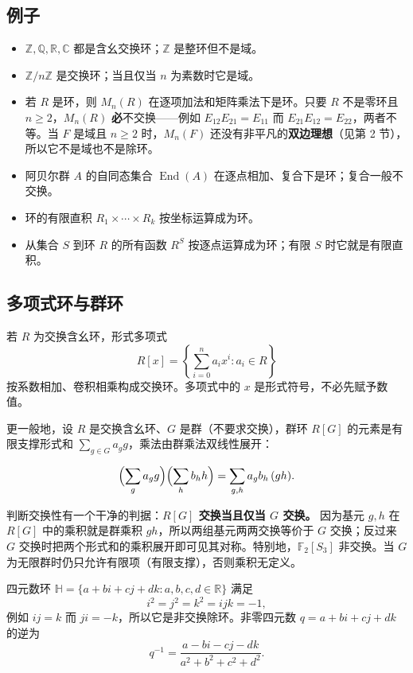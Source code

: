 \subsection{例子}


\begin{itemize}
\item $\mathbb Z,\mathbb Q,\mathbb R,\mathbb C$ 都是含幺交换环；$\mathbb Z$ 是整环但不是域。
\item $\mathbb Z/n\mathbb Z$ 是交换环；当且仅当 $n$ 为素数时它是域。
\item 若 $R$ 是环，则 $M_n(R)$ 在逐项加法和矩阵乘法下是环。只要 $R$ 不是零环且 $n\ge2$，$M_n(R)$ \textbf{必}不交换——例如 $E_{12}E_{21}=E_{11}$ 而 $E_{21}E_{12}=E_{22}$，两者不等。当 $F$ 是域且 $n\ge2$ 时，$M_n(F)$ 还没有非平凡的\textbf{双边理想}（见第 2 节），所以它不是域也不是除环。
\item 阿贝尔群 $A$ 的自同态集合 $\operatorname{End}(A)$ 在逐点相加、复合下是环；复合一般不交换。
\item 环的有限直积 $R_1\times\cdots\times R_k$ 按坐标运算成为环。
\item 从集合 $S$ 到环 $R$ 的所有函数 $R^S$ 按逐点运算成为环；有限 $S$ 时它就是有限直积。
\end{itemize}


\subsection{多项式环与群环}


若 $R$ 为交换含幺环，形式多项式
\[R[x]=\left\{\sum_{i=0}^n a_i x^i:a_i\in R\right\}\]
按系数相加、卷积相乘构成交换环。多项式中的 $x$ 是形式符号，不必先赋予数值。

更一般地，设 $R$ 是交换含幺环、$G$ 是群（不要求交换），群环 $R[G]$ 的元素是有限支撑形式和 $\sum_{g\in G}a_g g$，乘法由群乘法双线性展开：

\[
\Bigl(\sum_{g}a_g g\Bigr)\Bigl(\sum_{h}b_h h\Bigr)=\sum_{g,h}a_gb_h\,(gh).
\]

判断交换性有一个干净的判据：\textbf{$R[G]$ 交换当且仅当 $G$ 交换。} 因为基元 $g,h$ 在 $R[G]$ 中的乘积就是群乘积 $gh$，所以两组基元两两交换等价于 $G$ 交换；反过来 $G$ 交换时把两个形式和的乘积展开即可见其对称。特别地，$\mathbb F_2[S_3]$ 非交换。当 $G$ 为无限群时仍只允许有限项（有限支撑），否则乘积无定义。

四元数环 $\mathbb H=\{a+bi+cj+dk:a,b,c,d\in\mathbb R\}$ 满足
\[i^2=j^2=k^2=ijk=-1,\]
例如 $ij=k$ 而 $ji=-k$，所以它是非交换除环。非零四元数 $q=a+bi+cj+dk$ 的逆为
\[q^{-1}=\frac{a-bi-cj-dk}{a^2+b^2+c^2+d^2}.\]

